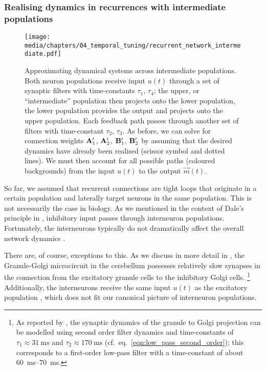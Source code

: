 \subsubsection{Realising dynamics in recurrences with intermediate populations}

\begin{figure}
	\texttt{[image: media/chapters/04\_temporal\_tuning/recurrent\_network\_intermediate.pdf]}
	\caption[Approximating dynamical systems across intermediate populations]{Approximating dynamical systems across intermediate populations. Both neuron populations receive input $u(t)$ through a set of synaptic filters with time-constants $\tau_1$, $\tau_4$; the upper, or \enquote{intermediate} population then projects onto the lower population, the lower population provides the output and projects onto the upper population. Each feedback path passes through another set of filters with time-constant $\tau_2$, $\tau_3$.
	As before, we can solve for connection weights $\mathbf{A}_1'$, $\mathbf{A}_2'$, $\mathbf{B}_1'$, $\mathbf{B}_2'$ by assuming that the desired dynamics have already been realised (scissor symbol and dotted lines).
	We must then account for all possible paths (coloured backgrounds) from the input $u(t)$ to the output $\vec m(t)$.
	}
	\label{fig:recurrent_network_intermediate}
\end{figure}

So far, we assumed that recurrent connections are tight loops that originate in a certain population and laterally target neurons in the same population.
This is not necessarily the case in biology.
As we mentioned in the context of Dale's principle in , inhibitory input passes through interneuron populations.
Fortunately, the interneurons typically do not dramatically affect the overall network dynamics \citep{parisien2008solving}.

There are, of course, exceptions to this.
As we discuss in more detail in , the Granule-Golgi microcircuit in the cerebellum possesses relatively slow synapses in the connection from the excitatory granule cells to the inhibitory Golgi cells.%
\footnote{As reported by \citet{dieudonne1998submillisecond}, the synaptic dynamics of the granule to Golgi projection can be modelled using second order filter dynamics and time-constants of $\tau_1 \approx \SI{31}{\milli\second}$ and $\tau_2 \approx \SI{170}{\milli\second}$ (cf.~eq.~\ref{eqn:low_pass_second_order}); this corresponds to a first-order low-pass filter with a time-constant of about \SIrange{60}{70}{\milli\second}.}
Additionally, the interneurons receive the same input $u(t)$ as the excitatory population \citep{dangelo2013cerebellar}, which does not fit our canonical picture of interneuron populations.

